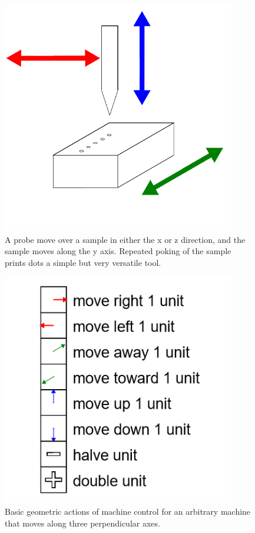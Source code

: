 \begin{figure}
	\centering
	\includegraphics[width=4in]{figures/machines/xyzprobe.png}
	\caption[xyzprobe]
	{A probe move over a sample in either the x or z direction, and the sample moves along the y axis.  Repeated poking of the sample prints dots a simple but very versatile tool.}
\end{figure}


\begin{figure}
	\centering
	\includegraphics[width=4in]{figures/machines/basicmovements.png}
	\caption[basicmovements]
	{Basic geometric actions of machine control for an arbitrary machine that moves along three perpendicular axes.}
\end{figure}

